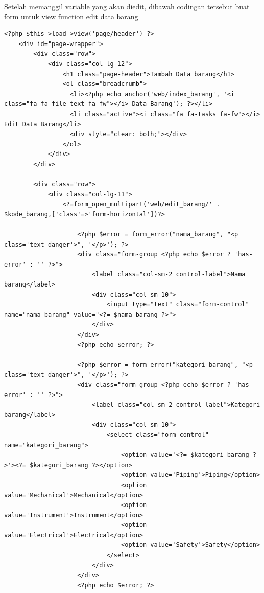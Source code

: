 \begin{enumerate}
\begin{enumerate}
    		\par Setelah memanggil variable yang akan diedit, dibawah codingan tersebut buat form untuk view function edit data barang
\begin{lstlisting}
<?php $this->load->view('page/header') ?>
    <div id="page-wrapper">
        <div class="row">
            <div class="col-lg-12">
                <h1 class="page-header">Tambah Data barang</h1>
                <ol class="breadcrumb">
                  <li><?php echo anchor('web/index_barang', '<i class="fa fa-file-text fa-fw"></i> Data Barang'); ?></li>
                  <li class="active"><i class="fa fa-tasks fa-fw"></i> Edit Data Barang</li>
                  <div style="clear: both;"></div>
                </ol>
            </div>
        </div>

        <div class="row">
            <div class="col-lg-11">
                <?=form_open_multipart('web/edit_barang/' . $kode_barang,['class'=>'form-horizontal'])?>

                    <?php $error = form_error("nama_barang", "<p class='text-danger'>", '</p>'); ?>
                    <div class="form-group <?php echo $error ? 'has-error' : '' ?>">
                        <label class="col-sm-2 control-label">Nama barang</label>
                        <div class="col-sm-10">
                            <input type="text" class="form-control" name="nama_barang" value="<?= $nama_barang ?>">
                        </div>
                    </div>
                    <?php echo $error; ?>

                    <?php $error = form_error("kategori_barang", "<p class='text-danger'>", '</p>'); ?>
                    <div class="form-group <?php echo $error ? 'has-error' : '' ?>">
                        <label class="col-sm-2 control-label">Kategori barang</label>
                        <div class="col-sm-10">
                            <select class="form-control" name="kategori_barang">
                                <option value='<?= $kategori_barang ?>'><?= $kategori_barang ?></option>
                                <option value='Piping'>Piping</option>
                                <option value='Mechanical'>Mechanical</option>
                                <option value='Instrument'>Instrument</option>
                                <option value='Electrical'>Electrical</option>
                                <option value='Safety'>Safety</option>
                            </select>
                        </div>
                    </div>
                    <?php echo $error; ?>


\end{lstlisting}
\end{enumerate}
\end{enumerate}
